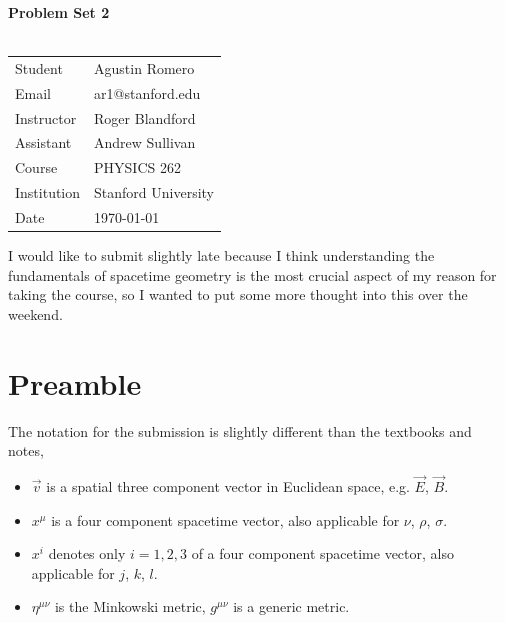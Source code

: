 \documentclass{article}
\begin{document}
\begin{center}
\textbf{\Large{Problem Set 2}}\\~\\
\begin{tabular}{l l}
Student&Agustin Romero\\
Email&ar1@stanford.edu\\
Instructor&Roger Blandford\\
Assistant&Andrew Sullivan\\
Course&PHYSICS 262\\
Institution&Stanford University\\
Date&\today\\
\end{tabular}
\end{center}
I would like to submit slightly late because I think understanding the fundamentals of spacetime geometry is the most crucial aspect of my reason for taking the course, so I wanted to put some more thought into this over the weekend.
\section*{Preamble}
The notation for the submission is slightly different than the textbooks and notes,
\begin{itemize}
\item $\vec{v}$ is a spatial three component vector in Euclidean space, e.g. $\vec{E}$, $\vec{B}$.
\item $x^\mu$ is a four component spacetime vector, also applicable for $\nu$, $\rho$, $\sigma$.
\item $x^i$ denotes only $i=1,2,3$ of a four component spacetime vector, also applicable for $j$, $k$, $l$.
\item $\eta^{\mu\nu}$ is the Minkowski metric, $g^{\mu\nu}$ is a generic metric.
\end{itemize}
\end{document}

